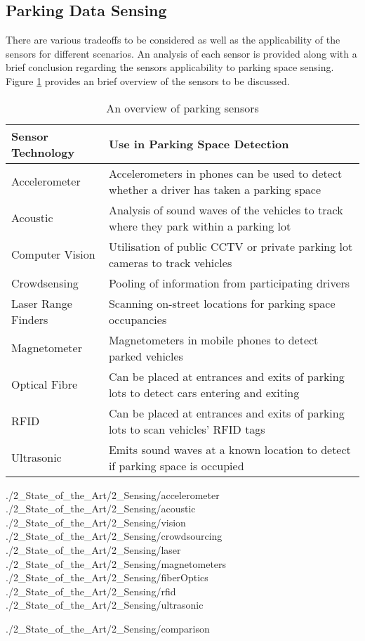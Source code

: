 \subsection{Parking Data Sensing}
There are various tradeoffs to be considered as well as the applicability of the sensors for different scenarios. An analysis of each sensor is provided along with a brief conclusion regarding the sensors applicability to parking space sensing. Figure \ref{table:sensor_description} provides an brief overview of the sensors to be discussed.

\begin{table}[H]
    \begin{center}
        \begin{tabularx}{\textwidth}{l|p{10cm}}
            \textbf{Sensor Technology} & \textbf{Use in Parking Space Detection} \\
            \hline
            Accelerometer & Accelerometers in phones can be used to detect whether a driver has taken a parking space \\ \hline
            Acoustic & Analysis of sound waves of the vehicles to track where they park within a parking lot \\ \hline
            Computer Vision & Utilisation of public CCTV or private parking lot cameras to track vehicles \\ \hline
            Crowdsensing & Pooling of information from participating drivers \\ \hline
            Laser Range Finders & Scanning on-street locations for parking space occupancies \\ \hline
            Magnetometer & Magnetometers in mobile phones to detect parked vehicles \\ \hline
            Optical Fibre & Can be placed at entrances and exits of parking lots to detect cars entering and exiting \\ \hline
            \ac{RFID} & Can be placed at entrances and exits of parking lots to scan vehicles' \ac{RFID} tags \\ \hline
            Ultrasonic & Emits sound waves at a known location to detect if parking space is occupied \\ 
        \end{tabularx}
    \caption{An overview of parking sensors}
    \label{table:sensor_description}
    \end{center}
\end{table}

{./2_State_of_the_Art/2_Sensing/accelerometer}
{./2_State_of_the_Art/2_Sensing/acoustic}
{./2_State_of_the_Art/2_Sensing/vision}
{./2_State_of_the_Art/2_Sensing/crowdsourcing}
{./2_State_of_the_Art/2_Sensing/laser}
{./2_State_of_the_Art/2_Sensing/magnetometers}
{./2_State_of_the_Art/2_Sensing/fiberOptics}
{./2_State_of_the_Art/2_Sensing/rfid}
{./2_State_of_the_Art/2_Sensing/ultrasonic}

{./2_State_of_the_Art/2_Sensing/comparison}
